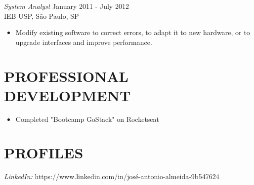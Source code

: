 \documentclass[margin, 10pt]{res} %
\begin{document}
\begin{resume}
{\sl System Analyst} \hfill January 2011 - July 2012 \\
IEB-USP, São Paulo, SP
\begin{itemize} \itemsep -2pt %
\item Modify existing software to correct errors, to adapt it to new hardware, or to upgrade interfaces and improve performance.
\end{itemize} 




\section{PROFESSIONAL \\ DEVELOPMENT} 

\begin{itemize}
\item Completed "Bootcamp GoStack" on Rocketseat
\end{itemize}


\section{PROFILES}

{\sl LinkedIn:} https://www.linkedin.com/in/josé-antonio-almeida-9b547624



\end{resume}
\end{document}
